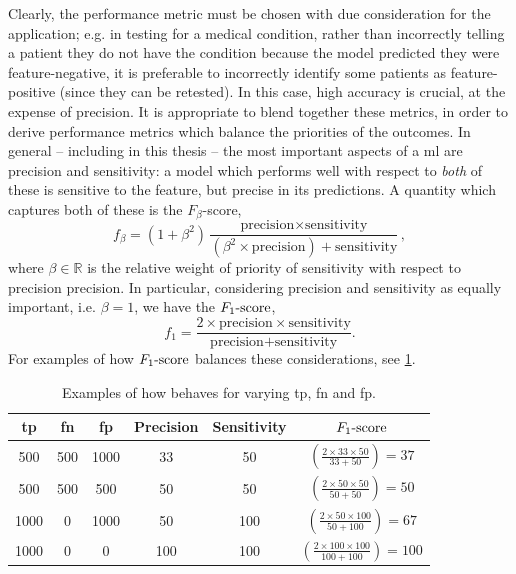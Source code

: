 Clearly, the performance metric must be chosen with due consideration for the application;
    e.g. in testing for a medical condition, rather than incorrectly telling a patient they do not have the condition because the 
    model predicted they were feature-negative, it is preferable to incorrectly identify some patients as feature-positive (since they can be retested). 
In this case, high accuracy is crucial, at the expense of precision. 
It is appropriate to blend together these metrics, in order to derive performance metrics which balance the priorities of the outcomes.
In general -- including in this thesis -- the most important aspects of a \gls{ml} are precision and sensitivity: 
    a model which performs well with respect to \emph{both} of these is sensitive to the feature, but precise in its predictions. 
A quantity which captures both of these is the $F_{\beta}$-score, 
\begin{equation}\label{eqn:f_beta}
    f_{\beta} = \left( 1 + \beta^2 \right) \frac{
        \textrm{precision} \times \textrm{sensitivity} }{
        \left(\beta^2\times\textrm{precision}\right) + \textrm{sensitivity}},
\end{equation}
where $\beta \in \mathbb{R}$ is the relative weight of priority of sensitivity with respect to precision precision. 
In particular, considering precision and sensitivity as equally important, i.e. $\beta=1$, 
    we have the $\fs$, 
\begin{equation}
    \label{eqn:f_score_def}
    f_1 = \frac{2 \times \textrm{precision} \times \textrm{sensitivity} }{\textrm{precision} + \textrm{sensitivity}}.
\end{equation}
For examples of how $\fs$ balances these considerations, see \cref{table:f1_example}.
\par

\begin{table}
    \centering
    \begin{tabular}{|ccc|cc|c|}
        \hline
        \Acrlong{tp} & \Acrlong{fn} & \Acrlong{fp} & Precision & Sensitivity & $\fs$  \\
        \hline
        \rule{0pt}{3ex} 500 & 500 & 1000 & 33 & 50 & $ (\frac{2 \times 33 \times 50 }{33 + 50 }) = 37 $ \\
        \rule{0pt}{3ex} 500 & 500 & 500 & 50 & 50 & $( \frac{2 \times 50 \times 50 }{50 + 50 } ) = 50 $ \\
        \rule{0pt}{3ex} 1000 & 0 & 1000 & 50 & 100 & $ (\frac{2 \times 50 \times 100} { 50 + 100 }) = 67 $ \\
        \rule{0pt}{3ex} 1000  & 0 & 0 & 100 & 100 & $ (\frac{2 \times 100 \times 100}{100 + 100}) = 100 $ \\
        \hline
    \end{tabular}
    \caption[$\fs$ examples]{
        Examples of how \fs behaves for varying \acrlong{tp}, \acrlong{fn} and \acrlong{fp}. 
    }
    \label{table:f1_example}
\end{table}


